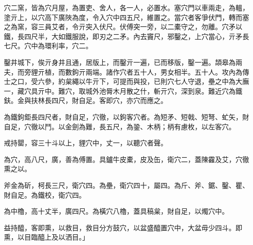 \begin{pinyinscope}
穴二窯，皆為穴月屋，為置吏、舍人，各一人，必置水。塞穴門以車兩走，為轀，塗亓上，以穴高下廣陜為度，令入穴中四五尺，維置之。當穴者客爭伏門，轉而塞之為窯，容三員艾者，令亓突入伏尺。伏傅突一旁，以二橐守之，勿離。穴矛以鐵，長四尺半，大如鐵服說，即刃之二矛。內去竇尺，邪鑿之，上穴當心，亓矛長七尺。穴中為環利率，穴二。

鑿井城下，俟亓身井且通，居版上，而鑿亓一遍，已而移版，鑿一遍。頡皋為兩夫，而旁貍亓植，而數鉤亓兩端。諸作穴者五十人，男女相半。五十人。攻內為傳士之口，受六參，約枲繩以牛亓下，可提而與投，已則穴七人守退，壘之中為大廡一，藏穴具亓中。難穴，取城外池脣木月散之什，斬亓穴，深到泉。難近穴為鐵鈇。金與扶林長四尺，財自足。客即穴，亦穴而應之。

為鐵鉤鉅長四尺者，財自足，穴徹，以鉤客穴者。為短矛、短戟、短弩、虻矢，財自足，穴徹以鬥。以金劍為難，長五尺，為銎、木柄；柄有慮枚，以左客穴。

戒持罌，容三十斗以上，貍穴中，丈一，以聽穴者聲。

為穴，高八尺，廣，善為傅置。具鑪牛皮橐，皮及缶，衛穴二，蓋陳靃及艾，穴徹熏之以。

斧金為斫，柯長三尺，衛穴四。為壘，衛穴四十，屬四。為斤、斧、鋸、鑿、瞿、財自足。為鐵校，衛穴四。

為中櫓，高十丈半，廣四尺。為橫穴八櫓，蓋具稿枲，財自足，以燭穴中。

益持醯，客即熏，以救目，救目分方鼓穴，以盆盛醯置穴中，大盆毋少四斗。即熏，以目臨醯上及以洒目。」


\end{pinyinscope}